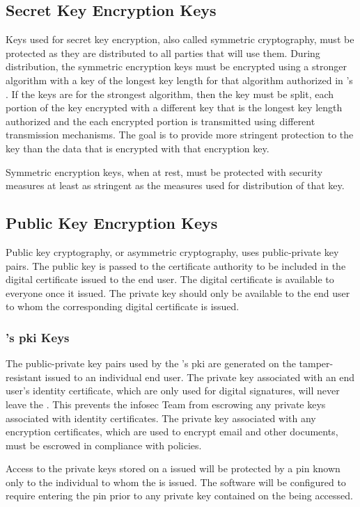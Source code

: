 \subsection{Secret Key Encryption Keys}
Keys used for secret key encryption, also called symmetric cryptography, must be protected as they are distributed to all parties that will use them.  
During distribution, the symmetric encryption keys must be encrypted using a stronger algorithm with a key of the longest key length for that algorithm authorized in \CompanyName{}'s .  
If the keys are for the strongest algorithm, then the key must be split, each portion of the key encrypted with a different key that is the longest key length authorized and the each encrypted portion is transmitted using different transmission mechanisms.  
The goal is to provide more stringent protection to the key than the data that is encrypted with that encryption key.

Symmetric encryption keys, when at rest, must be protected with security measures at least as stringent as the measures used for distribution of that key.
\subsection{Public Key Encryption Keys}
Public key cryptography, or asymmetric cryptography, uses public-private key pairs.  
The public key is passed to the certificate authority to be included in the digital certificate issued to the end user.  
The digital certificate is available to everyone once it issued.  
The private key should only be available to the end user to whom the corresponding digital certificate is issued.
\subsubsection{\CompanyName{}'s \gls{pki} Keys}
The public-private key pairs used by the \CompanyName{}'s \gls{pki} are generated on the tamper-resistant \smartcard{} issued to an individual end user.  
The private key associated with an end user's identity certificate, which are only used for digital signatures, will never leave the \smartcard{}.  
This prevents the \gls{infosec} Team from escrowing any private keys associated with identity certificates.  
The private key associated with any encryption certificates, which are used to encrypt email and other documents, must be escrowed in compliance with \CompanyName{} policies.

Access to the private keys stored on a \CompanyName{}\ins{-}issued \smartcard{} will be protected by a \gls{pin} known only to the individual to whom the \smartcard{} is issued.  
The \smartcard{} software will be configured to require entering the \gls{pin} prior to any private key contained on the \smartcard{} being accessed.

